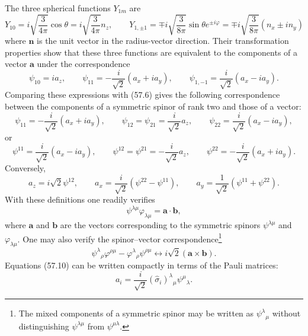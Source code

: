 The three spherical functions $Y_{1m}$ are
\[
 Y_{10}=i\sqrt{\frac3{4\pi}}\cos\theta=i\sqrt{\frac3{4\pi}}n_z,
 \qquad
 Y_{1,\pm1}=\mp i\sqrt{\frac3{8\pi}}\sin\theta e^{\pm i\varphi}
 =\mp i\sqrt{\frac3{8\pi}}(n_x\pm in_y)
\]
where $\mathbf n$ is the unit vector in the radius-vector direction. Their
transformation properties show that these three functions are equivalent to
the components of a vector $\mathbf a$ under the correspondence
\begin{equation}
 \psi_{10}=ia_z,\qquad
 \psi_{11}=-\frac i{\sqrt2}(a_x+ia_y),\qquad
 \psi_{1,-1}=\frac i{\sqrt2}(a_x-ia_y).
 \tag{57.7}
\end{equation}
Comparing these expressions with (57.6) gives the following correspondence
between the components of a symmetric spinor of rank two and those of a
vector:
\begin{equation}
 \psi_{11}=-\frac i{\sqrt2}(a_x+ia_y),\qquad
 \psi_{12}=\psi_{21}=\frac i{\sqrt2}a_z,\qquad
 \psi_{22}=\frac i{\sqrt2}(a_x-ia_y),
 \tag{57.8}
\end{equation}
or
\begin{equation}
 \psi^{11}=\frac i{\sqrt2}(a_x-ia_y),\qquad
 \psi^{12}=\psi^{21}=-\frac i{\sqrt2}a_z,\qquad
 \psi^{22}=-\frac i{\sqrt2}(a_x+ia_y).
 \tag{57.9}
\end{equation}
Conversely,
\begin{equation}
 a_z=i\sqrt2\psi^{12},\qquad
 a_x=\frac i{\sqrt2}(\psi^{22}-\psi^{11}),\qquad
 a_y=\frac1{\sqrt2}(\psi^{11}+\psi^{22}).
 \tag{57.10}
\end{equation}
With these definitions one readily verifies
\begin{equation}
 \psi^{\lambda\mu}\varphi_{\lambda\mu}=\mathbf a\cdot\mathbf b,
 \tag{57.11}
\end{equation}
where $\mathbf a$ and $\mathbf b$ are the vectors corresponding to the
symmetric spinors $\psi^{\lambda\mu}$ and $\varphi_{\lambda\mu}$. One may
also verify the spinor--vector correspondence\footnote{The mixed components
of a symmetric spinor may be written as $\psi^\lambda{}_{\mu}$ without
distinguishing $\psi^{\lambda\mu}$ from $\psi^{\mu\lambda}$.}
\begin{equation}
 \psi^\lambda{}_{\rho}\varphi^{\rho\mu}
 -\varphi^\lambda{}_{\rho}\psi^{\rho\mu}
 \longleftrightarrow i\sqrt2(\mathbf a\times\mathbf b).
 \tag{57.12}
\end{equation}
Equations (57.10) can be written compactly in terms of the Pauli matrices:
\begin{equation}
 a_i=\frac i{\sqrt2}(\hat\sigma_i)^\lambda{}_{\mu}\psi^\mu{}_{\lambda}.
 \tag{57.13}
\end{equation}


